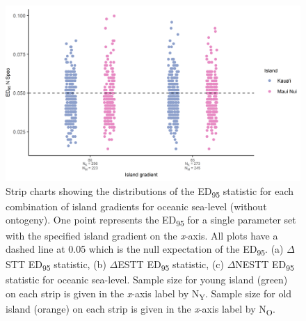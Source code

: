 \begin{figure}
    \centering
    \includegraphics{oceanic_sea_level_gradient_nltt.png}
    \caption{Strip charts showing the distributions of the ED\textsubscript{95} statistic for each combination of island gradients for oceanic sea-level (without ontogeny). One point represents the ED\textsubscript{95} for a single parameter set with the specified island gradient on the \textit{x}-axis. All plots have a dashed line at 0.05 which is the null expectation of the ED\textsubscript{95}. (a) $\Delta$STT ED\textsubscript{95} statistic, (b) $\Delta$ESTT ED\textsubscript{95} statistic, (c) $\Delta$NESTT ED\textsubscript{95} statistic for oceanic sea-level. Sample size for young island (green) on each strip is given in the \textit{x}-axis label by N\textsubscript{Y}. Sample size for old island (orange) on each strip is given in the \textit{x}-axis label by N\textsubscript{O}.}
    \label{fig:oceanic_sea_level_gradient_nltt}
\end{figure}

